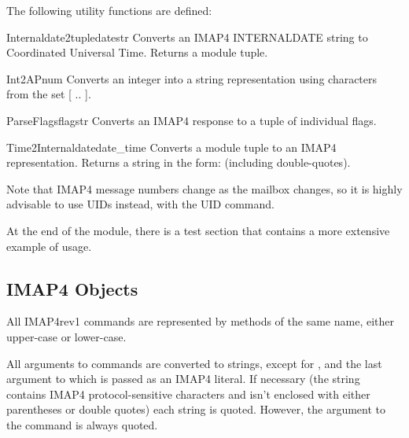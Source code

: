 The following utility functions are defined:

\begin{funcdesc}{Internaldate2tuple}{datestr}
  Converts an IMAP4 INTERNALDATE string to Coordinated Universal
  Time. Returns a  module tuple.
\end{funcdesc}

\begin{funcdesc}{Int2AP}{num}
  Converts an integer into a string representation using characters
  from the set [ .. ].
\end{funcdesc}

\begin{funcdesc}{ParseFlags}{flagstr}
  Converts an IMAP4  response to a tuple of individual
  flags.
\end{funcdesc}

\begin{funcdesc}{Time2Internaldate}{date_time}
  Converts a  module tuple to an IMAP4
   representation.  Returns a string in the form:
   (including double-quotes).
\end{funcdesc}


Note that IMAP4 message numbers change as the mailbox changes, so it
is highly advisable to use UIDs instead, with the UID command.

At the end of the module, there is a test section that contains a more
extensive example of usage.

\begin{seealso}
\end{seealso}


\subsection{IMAP4 Objects \label{imap4-objects}}

All IMAP4rev1 commands are represented by methods of the same name,
either upper-case or lower-case.

All arguments to commands are converted to strings, except for
, and the last argument to  which is
passed as an IMAP4 literal.  If necessary (the string contains IMAP4
protocol-sensitive characters and isn't enclosed with either
parentheses or double quotes) each string is quoted. However, the
 argument to the  command is always quoted.

